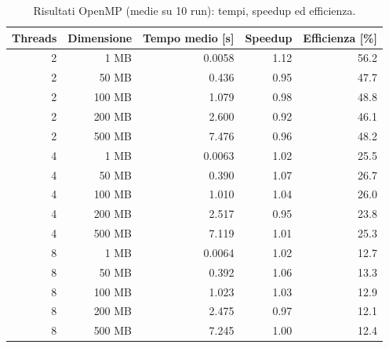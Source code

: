 			\begin{table}[H]
				\centering
				\begin{tabular}{|r|r|r|r|r|}
					\hline
					\textbf{Threads} & \textbf{Dimensione} & \textbf{Tempo medio [s]} & \textbf{Speedup} & \textbf{Efficienza [\%]} \\
					\hline
					2                     & 1 MB                & 0.0058                   & 1.12             & 56.2                     \\
					2                     & 50 MB               & 0.436                    & 0.95             & 47.7                     \\
					2                     & 100 MB              & 1.079                    & 0.98             & 48.8                     \\
					2                     & 200 MB              & 2.600                    & 0.92             & 46.1                     \\
					2                     & 500 MB              & 7.476                    & 0.96             & 48.2                     \\
					\hline
					4                     & 1 MB                & 0.0063                   & 1.02             & 25.5                     \\
					4                     & 50 MB               & 0.390                    & 1.07             & 26.7                     \\
					4                     & 100 MB              & 1.010                    & 1.04             & 26.0                     \\
					4                     & 200 MB              & 2.517                    & 0.95             & 23.8                     \\
					4                     & 500 MB              & 7.119                    & 1.01             & 25.3                     \\
					\hline
					8                     & 1 MB                & 0.0064                   & 1.02             & 12.7                     \\
					8                     & 50 MB               & 0.392                    & 1.06             & 13.3                     \\
					8                     & 100 MB              & 1.023                    & 1.03             & 12.9                     \\
					8                     & 200 MB              & 2.475                    & 0.97             & 12.1                     \\
					8                     & 500 MB              & 7.245                    & 1.00             & 12.4                     \\
					\hline
				\end{tabular}
				\caption{Risultati OpenMP (medie su 10 run): tempi, speedup ed efficienza.}
				\label{tab:omp-summary}
			\end{table}
			
